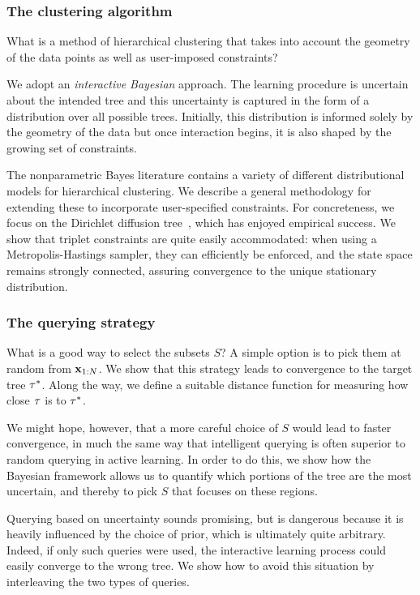 \subsubsection*{The clustering algorithm}

What is a method of hierarchical clustering that takes into account the geometry of the data points as well as user-imposed constraints? 

We adopt an \emph{interactive Bayesian} approach. The learning procedure is uncertain about the intended tree and this uncertainty is captured in the form of a distribution over all possible trees. Initially, this distribution is informed solely by the geometry of the data but once interaction begins, it is also shaped by the growing set of constraints.

The nonparametric Bayes literature contains a variety of different distributional models for hierarchical clustering. We describe a general methodology for extending these to incorporate user-specified constraints. For concreteness, we focus on the Dirichlet diffusion tree~\citep{Neal2003}, which has enjoyed empirical success. We show that triplet constraints are quite easily accommodated: when using a Metropolis-Hastings sampler, they can efficiently be enforced, and the state space remains strongly connected, assuring convergence to the unique stationary distribution.

\subsubsection*{The querying strategy}

What is a good way to select the subsets $S$? A simple option is to pick them at random from $\mathbf{x}_{1:N}$. We show that this strategy leads to convergence to the target tree $\tau^*$. Along the way, we define a suitable distance function for measuring how close $\tau$ is to $\tau^*$. 


We might hope, however, that a more careful choice of $S$ would lead to faster convergence, in much the same way that intelligent querying is often superior to random querying in active learning. In order to do this, we show how the Bayesian framework allows us to quantify which portions of the tree are the most uncertain, and thereby to pick $S$ that focuses on these regions.

Querying based on uncertainty sounds promising, but is dangerous because it is heavily influenced by the choice of prior, which is ultimately quite arbitrary. Indeed, if only such queries were used, the interactive learning process could easily converge to the wrong tree. We show how to avoid this situation by interleaving the two types of queries.

